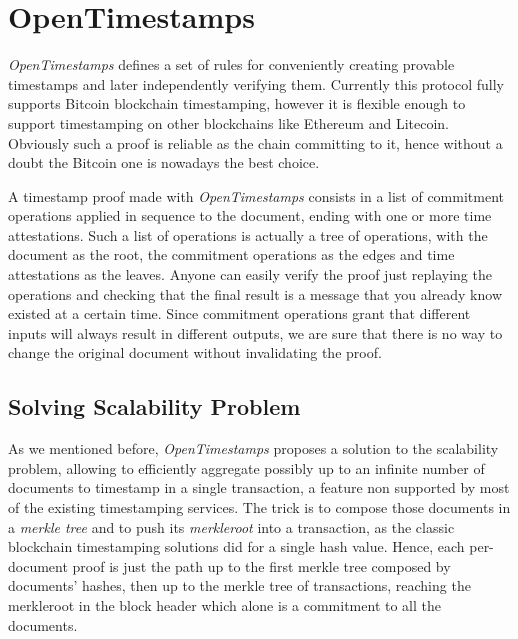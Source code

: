 \bigskip
\section{OpenTimestamps}
\label{sec:ots}
\textit{OpenTimestamps} defines a set of rules for conveniently creating provable timestamps and later independently verifying them. Currently this protocol fully supports Bitcoin blockchain timestamping, however it is flexible enough to support timestamping on other blockchains like Ethereum and Litecoin. Obviously such a proof is reliable as the chain committing to it, hence without a doubt the Bitcoin one is nowadays the best choice.

\bigskip
\noindent
A timestamp proof made with \textit{OpenTimestamps} consists in a list of commitment operations applied in sequence to the document, ending with one or more time attestations. Such a list of operations is actually a tree of operations, with the document as the root, the commitment operations as the edges and time attestations as the leaves. Anyone can easily verify the proof just replaying the operations and checking that the final result is a message that you already know existed at a certain time. Since commitment operations grant that different inputs will always result in different outputs, we are sure that there is no way to change the original document without invalidating the proof.

\bigskip
\subsection{Solving Scalability Problem}
As we mentioned before, \textit{OpenTimestamps} proposes a solution to the scalability problem, allowing to efficiently aggregate possibly up to an infinite number of documents to timestamp in a single transaction, a feature non supported by most of the existing timestamping services. The trick is to compose those documents in a \textit{merkle tree} and to push its \textit{merkleroot} into a transaction, as the classic blockchain timestamping solutions did for a single hash value. Hence, each per-document proof is just the path up to the first merkle tree composed by documents' hashes, then up to the merkle tree of transactions, reaching the merkleroot in the block header which alone is a commitment to all the documents.

